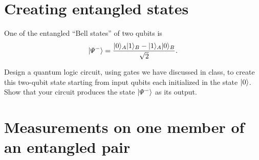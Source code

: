 \documentclass{../phys084}
\begin{document}
\section{Creating entangled states}

\begin{exercise}
  One of the entangled ``Bell states'' of two qubits is
  \[
    \lvert\Psi^-\rangle
    = \frac{\lvert0\rangle_A \lvert1\rangle_B - \lvert1\rangle_A \lvert0\rangle_B}{\sqrt 2}.
  \]

  Design a quantum logic circuit, using gates we have discussed in
  class, to create this two-qubit state starting from input qubits
  each initialized in the state \(\lvert0\rangle\).  Show that your circuit
  produces the state \(\lvert\Psi^-\rangle\) as its output.
\end{exercise}

\begin{solution}
\end{solution}

\section{Measurements on one member of an entangled pair}
\end{document}
